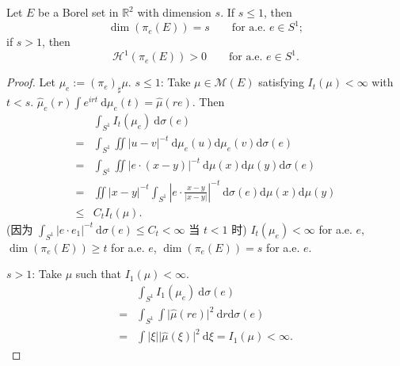 \begin{theorem}\label{thm:4.1}
Let $E$ be a Borel set in $\mathbb{R}^{2}$ with dimension $s$. If $s\leq 1$, then
$$
\operatorname{dim}(\pi _{e}(E))=s \qquad \text{for a.e. } e\in S^{1};
$$
if $s>1$, then
$$
\mathcal{H}^{1}(\pi _{e}(E))>0\qquad \text{for a.e. }e \in S^{1}.
$$
\end{theorem}
\begin{proof}
Let $\mu _{e}:=(\pi _{e})_{\sharp}\mu$.
$s\leq 1$: Take $\mu \in \mathcal{M}(E)$ satisfying $I_{t}(\mu)<\infty$ with $t<s$. $\hat{\mu}_{e}(r)\int e^{irt}\ \mathrm{d}\mu _{e}(t)=\hat{\mu}(re).$ Then
$$
\begin{aligned}
 & \int _{S^{1}}I_{t}(\mu _{e})\ \mathrm{d}\sigma(e)  \\
= & \int _{S^{1}}\iint \lvert u-v \rvert ^{-t}\ \mathrm{d}\mu _{e}(u)\mathrm{d}\mu _{e}(v)\mathrm{d}\sigma(e) \\
= & \int _{S^{1}}\iint \lvert e\cdot(x-y) \rvert ^{-t}\ \mathrm{d}\mu(x)\mathrm{d}\mu(y)\mathrm{d}\sigma(e) \\
= & \iint \lvert x-y \rvert ^{-t}\int _{S^{1}}\left\lvert e\cdot \frac{x-y}{\lvert x-y \rvert }\right\rvert ^{-t}\ \mathrm{d}\sigma(e)\mathrm{d}\mu(x)\mathrm{d}\mu(y) \\
\leq & C_{t}I_{t}(\mu).
\end{aligned}
$$
(因为 $\displaystyle \int _{S^{1}}\lvert e\cdot e_{1} \rvert^{-t}\ \mathrm{d}\sigma(e)\leq C_{t}<\infty$ 当 $t<1$ 时)
$I_{t}(\mu _{e})<\infty$ for a.e. $e$,
$\operatorname{dim}(\pi _{e}(E))\geq t$ for a.e. $e$,
$\operatorname{dim}(\pi _{e}(E))=s$ for a.e. $e$.

$s>1$: Take $\mu$ such that $I_{1}(\mu)<\infty$.
$$
\begin{aligned}
 & \int _{S^{1}}I_{1}(\mu _{e})\ \mathrm{d}\sigma(e) \\
= & \int _{S^{1}}\int \lvert \hat{\mu}(re) \rvert ^{2}\ \mathrm{d}r \mathrm{d}\sigma(e) \\
= & \int \lvert \xi \rvert \lvert \hat{\mu}(\xi )\rvert ^{2}\ \mathrm{d}\xi = I_{1}(\mu)<\infty.
\end{aligned}
$$
\end{proof}

